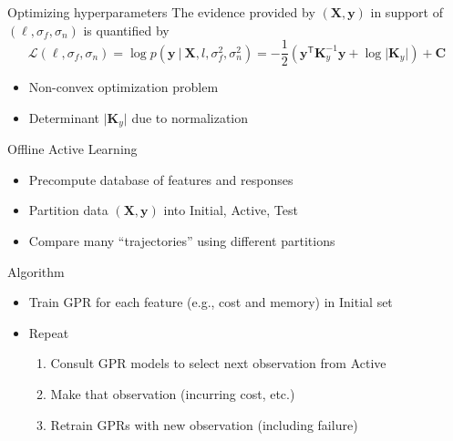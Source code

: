 \documentclass{beamer}
\newcommand{\matr}[1]{\bm{#1}}
\begin{document}
\begin{frame}{Optimizing hyperparameters}
  The evidence provided by $(\matr X, \matr y)$ in support of $(\ell, \sigma_f, \sigma_n)$ is quantified by
  \begin{equation*}
    \mathcal L(\ell, \sigma_f, \sigma_n) = \log p(\matr{y}~|~\matr{X},l,\sigma^2_f,\sigma^2_n)= -\frac{1}{2}\left( \matr{y}^\mathsf{T}\matr{K}^{-1}_y \matr{y} + \log \lvert\matr{K}_y\rvert \right) + \matr{C}
  \end{equation*}
  \begin{itemize}
  \item Non-convex optimization problem
  \item Determinant $\lvert\matr{K}_y\rvert$ due to normalization
  \end{itemize}
\end{frame}

\begin{frame}{Offline Active Learning}
  \begin{itemize}
  \item Precompute database of features and responses
  \item Partition data $(\matr X, \matr y)$ into Initial, Active, Test
  \item Compare many ``trajectories'' using different partitions
  \end{itemize}
  \begin{block}{Algorithm}
    \begin{itemize}
    \item Train GPR for each feature (e.g., cost and memory) in Initial set
    \item Repeat
      \begin{enumerate}
      \item Consult GPR models to select next observation from Active
      \item Make that observation (incurring cost, etc.)
      \item Retrain GPRs with new observation (including failure)
      \end{enumerate}
    \end{itemize}
  \end{block}
\end{frame}
\end{document}
